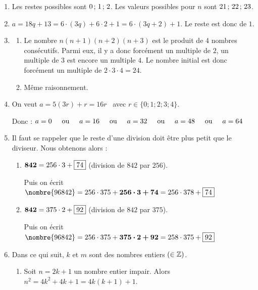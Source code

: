 \begin{enumerate}[label=\thechapter.\arabic*, font=\bfseries, itemsep=7mm,labelsep*=3mm,left=0mm]
\item 
Les restes possibles sont $0\pvirg{0.5} 1\pvirg{0.5} 2$. Les valeurs possibles pour $n$ sont $21\pvirg{0.5} 22\pvirg{0.5} 23$.



\item 
$a=18q+13=6\cdot(3q)+6\cdot 2 +1=6\cdot(3q+2)+1$. Le reste est donc de $1$.


\setlength{\itemsep}{10mm}
\item 
\begin{enumerate}[label=\alph*)]\setlength{\itemsep}{4mm}
\item Le nombre $n(n+1)(n+2)(n+3)$ est le produit de 4 nombres consécutifs. Parmi eux, il y a donc forcément un multiple de $2$, un multiple de $3$ est encore un multiple $4$. Le nombre initial est donc forcément un multiple de $2\cdot 3 \cdot 4 =24$.
\item Même raisonnement.
\end{enumerate}



\item 
On veut $a=5(3r)+r=16r$ \, avec $r\in\{0;1;2;3;4\}$.

\smallskip
Donc :  $a=0 \ou{5} a=16 \ou{5} a=32 \ou{5} a=48 \ou{5} a=64$




\item Il faut se rappeler que le reste d'une division doit être plus petit que le diviseur. Nous obtenons alors :
\begin{enumerate}[label=\alph*)]\setlength{\itemsep}{4mm}
\item $\bm{842}=256\cdot 3 +\fbox{$74$}$ (division de $842$ par $256$).

\smallskip
Puis on écrit $\nombre{96842}=256 \cdot 375+\bm{256\cdot 3+74}=256\cdot 378+\fbox{74} $
\item $\bm{842}=375\cdot 2 +\fbox{$92$}$ (division de $842$ par $375$).

\smallskip
Puis on écrit $\nombre{96842}=256 \cdot 375+\bm{375\cdot 2 +92}=258\cdot 375+\fbox{$92$} $
\end{enumerate}




\item Dans ce qui suit, $k$ et $m$ sont des nombres entiers $(\in \Z)$.

\begin{enumerate}[label=\alph*)]\setlength{\itemsep}{4mm}
\item Soit $n=2k+1$ un nombre entier impair. Alors $n^2=4k^2+4k+1=4 k (k+1)+1$.


\end{enumerate}
\end{enumerate}
